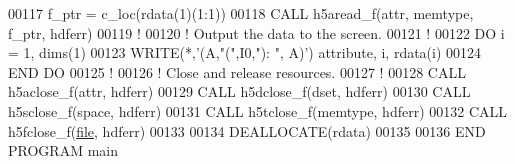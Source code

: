 \begin{DoxyCode}
00117   f\_ptr = c\_loc(rdata(1)(1:1))
00118   \textcolor{keyword}{CALL }h5aread\_f(attr, memtype, f\_ptr, hdferr)
00119   \textcolor{comment}{!}
00120   \textcolor{comment}{! Output the data to the screen.}
00121   \textcolor{comment}{!}
00122   \textcolor{keywordflow}{DO} i = 1, dims(1)
00123      \textcolor{keyword}{WRITE}(*,\textcolor{stringliteral}{'(A,"(",I0,"): ", A)'}) attribute, i, rdata(i)
00124 \textcolor{keywordflow}{  END DO}
00125   \textcolor{comment}{!}
00126   \textcolor{comment}{! Close and release resources.}
00127   \textcolor{comment}{!}
00128   \textcolor{keyword}{CALL }h5aclose\_f(attr, hdferr)
00129   \textcolor{keyword}{CALL }h5dclose\_f(dset, hdferr)
00130   \textcolor{keyword}{CALL }h5sclose\_f(space, hdferr)
00131   \textcolor{keyword}{CALL }h5tclose\_f(memtype, hdferr)
00132   \textcolor{keyword}{CALL }h5fclose\_f(\hyperlink{structfile}{file}, hdferr)
00133 
00134   \textcolor{keyword}{DEALLOCATE}(rdata)
00135 
00136 \textcolor{keyword}{END PROGRAM }main
\end{DoxyCode}
